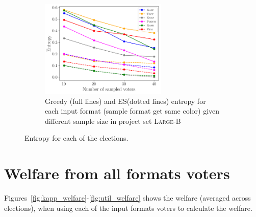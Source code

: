 \documentclass[runningheads]{llncs}
\newcommand{\knap}{\textsc{Knap}}
\newcommand{\kapp}{\textsc{Kapp}}
\newcommand{\mes}{ES}
\begin{document}
\begin{figure}[!h]
\begin{subfigure}[b]{0.45\textwidth}
     \end{subfigure}
     \hfill
     \begin{subfigure}[b]{0.45\textwidth}
         \centering
         \includegraphics[width=6cm]{experiment/entropy_large_b.png}
\caption{Greedy (full lines) and \mes (dotted lines) entropy  for each input format (sample format get same color) given different sample size in project set \textsc{Large-B} }\label{fig:entropy_lb}
     \end{subfigure}

        \caption{Entropy for each of the elections.}
        \label{fig:app_entropy}
\end{figure}


\section{Welfare from all formats voters}\label{app:aggregation}
Figures~\ref{fig:kapp_welfare}-\ref{fig:util_welfare} shows the welfare (averaged across elections), when using each of the input formats voters to calculate the welfare.



\end{document}
